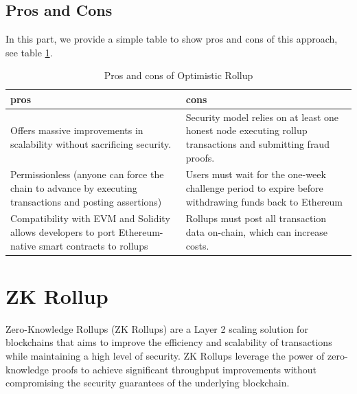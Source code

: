 \subsection{Pros and Cons}
In this part, we provide a simple table to show pros and cons of this approach, see table \ref{table:L14_t1}.
\begin{table}[htbp]
	\centering
	\captionsetup{justification=centering}
	\caption[position=above]{Pros and cons of Optimistic Rollup}
	\begin{tabular}{|>{\centering\arraybackslash}p{8cm}|>{\centering\arraybackslash}p{8cm}|}
		\hline
		\textbf{pros} & \textbf{cons}\\
		\hline
		Offers massive improvements in scalability without sacrificing security.
		& Security model relies on at least one honest node executing rollup transactions and submitting fraud proofs.\\
		\hline
		Permissionless (anyone can force the chain to advance by executing transactions and posting assertions) & Users must wait for the one-week challenge period to expire before withdrawing funds back to Ethereum \\
		\hline
		Compatibility with EVM and Solidity allows developers to port Ethereum-native smart contracts to rollups & Rollups must post all transaction data on-chain, which can increase costs. \\
		\hline
	\end{tabular}
	\label{table:L14_t1}
\end{table}
\section{ZK Rollup}
Zero-Knowledge Rollups (ZK Rollups) are a Layer 2 scaling solution for blockchains that aims to improve the efficiency and scalability of transactions while maintaining a high level of security. ZK Rollups leverage the power of zero-knowledge proofs to achieve significant throughput improvements without compromising the security guarantees of the underlying blockchain.

